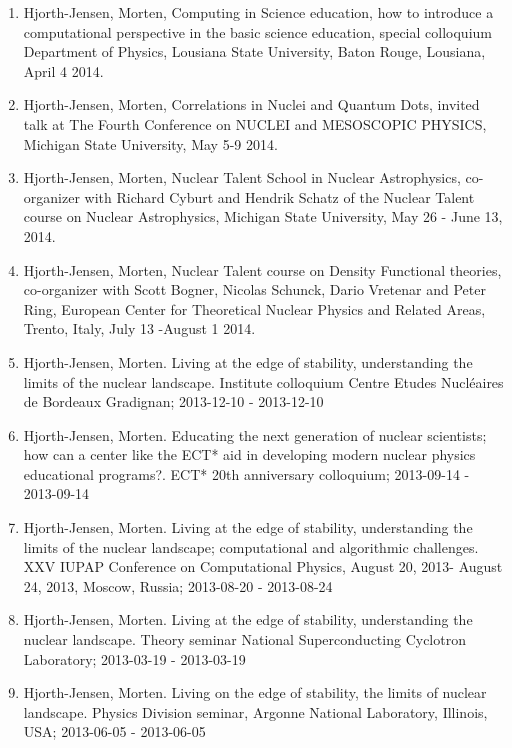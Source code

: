\documentclass[%
oneside,                 %
final,                   %
10pt]{article}
\begin{document}
\begin{enumerate}
\item Hjorth-Jensen, Morten, Computing in Science education, how to introduce a computational perspective in the basic science education, special colloquium Department of Physics, Lousiana State University, Baton Rouge, Lousiana, April 4 2014.

\item Hjorth-Jensen, Morten, Correlations in Nuclei and Quantum Dots, invited talk at  The Fourth Conference on NUCLEI and MESOSCOPIC PHYSICS, Michigan State University, May 5-9 2014.

\item Hjorth-Jensen, Morten, Nuclear Talent School in Nuclear Astrophysics, co-organizer with Richard Cyburt and Hendrik Schatz of the Nuclear Talent course on Nuclear Astrophysics,  Michigan State University, May 26 - June 13, 2014. 

\item Hjorth-Jensen, Morten, Nuclear Talent course on Density Functional theories, co-organizer with Scott Bogner, Nicolas Schunck, Dario Vretenar and Peter Ring, European Center for Theoretical Nuclear Physics and Related Areas, Trento, Italy, July 13 -August 1 2014.

\item Hjorth-Jensen, Morten.  Living at the edge of stability, understanding the limits of the nuclear landscape. Institute colloquium Centre Etudes Nucléaires de Bordeaux Gradignan; 2013-12-10 - 2013-12-10

\item Hjorth-Jensen, Morten.  Educating the next generation of nuclear scientists; how can a center like the ECT* aid in developing modern nuclear physics educational programs?. ECT* 20th anniversary colloquium; 2013-09-14 - 2013-09-14

\item Hjorth-Jensen, Morten.  Living at the edge of stability, understanding the limits of the nuclear landscape; computational and algorithmic challenges. XXV IUPAP Conference on Computational Physics, August 20, 2013- August 24, 2013, Moscow, Russia; 2013-08-20 - 2013-08-24

\item Hjorth-Jensen, Morten.  Living at the edge of stability, understanding the nuclear landscape. Theory seminar National Superconducting Cyclotron Laboratory; 2013-03-19 - 2013-03-19

\item Hjorth-Jensen, Morten.  Living on the edge of stability, the limits of nuclear landscape. Physics Division seminar, Argonne National Laboratory, Illinois, USA; 2013-06-05 - 2013-06-05


\end{enumerate}
\end{document}
